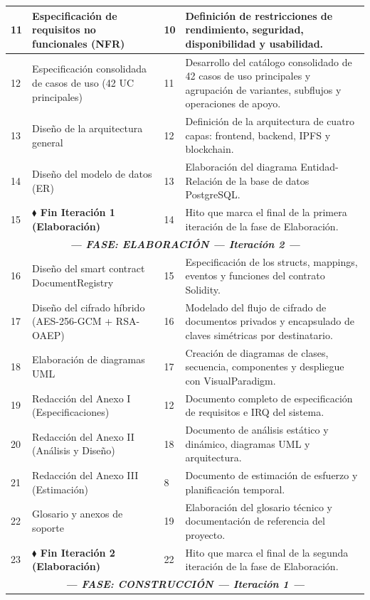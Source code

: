 \documentclass[11pt, a4paper]{article}
\begin{document}
\begin{longtable}{|p{1cm}|p{5.5cm}|p{1.5cm}|p{5.5cm}|}
\hline
11 & Especificación de requisitos no funcionales (NFR) & 10 & Definición de restricciones de rendimiento, seguridad, disponibilidad y usabilidad. \\
\hline
12 & Especificación consolidada de casos de uso (42 UC principales) & 11 & Desarrollo del catálogo consolidado de 42 casos de uso principales y agrupación de variantes, subflujos y operaciones de apoyo. \\
\hline
13 & Diseño de la arquitectura general & 12 & Definición de la arquitectura de cuatro capas: frontend, backend, IPFS y blockchain. \\
\hline
14 & Diseño del modelo de datos (ER) & 13 & Elaboración del diagrama Entidad-Relación de la base de datos PostgreSQL. \\
\hline
15 & \textbf{$\blacklozenge$ Fin Iteración 1 (Elaboración)} & 14 & Hito que marca el final de la primera iteración de la fase de Elaboración. \\
\hline
\multicolumn{4}{|c|}{\textit{\textbf{--- FASE: ELABORACIÓN --- Iteración 2 ---}}} \\
\hline
16 & Diseño del smart contract DocumentRegistry & 15 & Especificación de los structs, mappings, eventos y funciones del contrato Solidity. \\
\hline
17 & Diseño del cifrado híbrido (AES-256-GCM + RSA-OAEP) & 16 & Modelado del flujo de cifrado de documentos privados y encapsulado de claves simétricas por destinatario. \\
\hline
18 & Elaboración de diagramas UML & 17 & Creación de diagramas de clases, secuencia, componentes y despliegue con VisualParadigm. \\
\hline
19 & Redacción del Anexo I (Especificaciones) & 12 & Documento completo de especificación de requisitos e IRQ del sistema. \\
\hline
20 & Redacción del Anexo II (Análisis y Diseño) & 18 & Documento de análisis estático y dinámico, diagramas UML y arquitectura. \\
\hline
21 & Redacción del Anexo III (Estimación) & 8 & Documento de estimación de esfuerzo y planificación temporal. \\
\hline
22 & Glosario y anexos de soporte & 19 & Elaboración del glosario técnico y documentación de referencia del proyecto. \\
\hline
23 & \textbf{$\blacklozenge$ Fin Iteración 2 (Elaboración)} & 22 & Hito que marca el final de la segunda iteración de la fase de Elaboración. \\
\hline
\multicolumn{4}{|c|}{\textit{\textbf{--- FASE: CONSTRUCCIÓN --- Iteración 1 ---}}} \\

\end{longtable}
\end{document}
